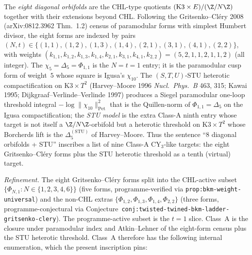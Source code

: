 The \emph{eight diagonal orbifolds} are the CHL-type quotients
$(\mathrm{K3} \times E)/(\Z/N\Z)$ together with their extensions
beyond CHL. Following the Gritsenko--Cl\'ery 2008
(arXiv:0812.3962 Thm.~1.2) census of paramodular forms with
simplest Humbert divisor, the eight forms are indexed by pairs
$(N, t) \in \{(1, 1), (1, 2), (1, 3), (1, 4), (2, 1), (3, 1),
(4, 1), (2, 2)\}$, with weights $(k_{1, 1}, k_{1, 2}, k_{1, 3},
k_{1, 4}, k_{2, 1}, k_{3, 1}, k_{4, 1}, k_{2, 2}) = (5, 2, 1, 1,
2, 1, 1, 2)$ (all integer). The $\chi_5 = \Delta_5 = \Phi_{1, 1}$
is the $N = t = 1$ entry; it is the paramodular cusp form of
weight~$5$ whose square is Igusa's $\chi_{10}$. The
$(S, T, U)$-STU heterotic compactification on $\mathrm{K3}\times
T^2$ (Harvey--Moore 1996 \emph{Nucl.\ Phys.\ B} 463, 315; Kawai
1995; Dijkgraaf--Verlinde--Verlinde 1997) produces a Siegel
paramodular one-loop threshold integral $-\log \|\chi_{10}
\|^2_{\mathrm{Pet}}$ that is the Quillen-norm of $\Phi_{1, 1} =
\Delta_5$ on the Igusa compactification; the \emph{STU model} is
the extra Class-A ninth entry whose target is not itself a
$\Z/N\Z$-orbifold but a heterotic threshold on
$\mathrm{K3} \times T^2$ whose Borcherds lift is the
$\Delta_5^{(\mathrm{STU})}$ of Harvey--Moore. Thus the sentence
``8 diagonal orbifolds + STU'' inscribes a list of nine Class-A
CY$_3$-like targets: the eight Gritsenko--Cl\'ery forms plus the
STU heterotic threshold as a tenth (virtual) target.

\emph{Refinement.} The eight Gritsenko--Cl\'ery forms split into
the CHL-active subset $\{\Phi_{N, 1} : N \in \{1, 2, 3, 4, 6\}\}$
(five forms, programme-verified via
\texttt{prop:bkm-weight-universal}) and the non-CHL extras
$\{\Phi_{1, 2}, \Phi_{1, 3}, \Phi_{1, 4}, \Phi_{2, 2}\}$ (three
forms, programme-conjectural via
Conjecture~\texttt{conj:twisted-twined-bkm-ladder-gritsenko-clery}).
The programme-active subset is the $t = 1$ slice. Class~A is the
closure under paramodular index and Atkin--Lehner
of the eight-form census plus the STU heterotic threshold.
Class~A therefore has the following internal enumeration, which
the present inscription pins:

